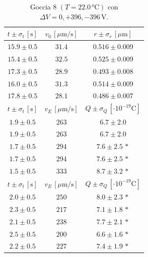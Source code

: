 \documentclass[]{article}
\begin{document}
    \begin{table}[H]
        \centering
        \begin{tabular}{||c|c|c||}
            \hline
            $t \pm \sigma_t \, \left[\text{s}\right]$ & $v_0 \, \left[\mu\text{m/s}\right]$ & $r \pm \sigma_r \, \left[\mu\text{m}\right]$ \\\hline
            \hline
            $15.9 \pm 0.5$ & $31.4$ & $0.516 \pm 0.009$ \\\hline
            $15.4 \pm 0.5$ & $32.5$ & $0.525 \pm 0.009$ \\\hline
            $17.3 \pm 0.5$ & $28.9$ & $0.493 \pm 0.008$ \\\hline
            $16.0 \pm 0.5$ & $31.3$ & $0.514 \pm 0.009$ \\\hline
            $17.8 \pm 0.5$ & $28.1$ & $0.486 \pm 0.007$ \\\hline
            \hline
            $t \pm \sigma_t \, \left[\text{s}\right]$ & $v_E \, \left[\mu\text{m/s}\right]$ & $Q \pm \sigma_Q \, \left[\cdot 10^{-19} \text{C}\right]$ \\\hline
            \hline
            $1.9 \pm 0.5$ & $263$ & $6.7 \pm 2.0$ \\\hline
            $1.9 \pm 0.5$ & $263$ & $6.7 \pm 2.0$ \\\hline
            $1.7 \pm 0.5$ & $294$ & $7.6 \pm 2.5\,\ast$ \\\hline
            $1.7 \pm 0.5$ & $294$ & $7.6 \pm 2.5\,\ast$ \\\hline
            $1.5 \pm 0.5$ & $333$ & $8.7 \pm 3.2\,\ast$ \\\hline
            \hline
            $t \pm \sigma_t \, \left[\text{s}\right]$ & $v_E \, \left[\mu\text{m/s}\right]$ & $Q \pm \sigma_Q \, \left[\cdot 10^{-19} \text{C}\right]$ \\\hline
            \hline
            $2.0 \pm 0.5$ & $250$ & $8.0 \pm 2.3\,\ast$ \\\hline
            $2.3 \pm 0.5$ & $217$ & $7.1 \pm 1.8\,\ast$ \\\hline
            $2.1 \pm 0.5$ & $238$ & $7.7 \pm 2.1\,\ast$ \\\hline
            $2.5 \pm 0.5$ & $200$ & $6.6 \pm 1.6\,\ast$ \\\hline
            $2.2 \pm 0.5$ & $227$ & $7.4 \pm 1.9\,\ast$ \\\hline
        \end{tabular}
        \caption{Goccia 8 $\left(T = 22.0\, \text{°C}\right)$ con $\Delta V = 0,+396,-396 \,\text{V}$.}
        \label{goccia-8}
    \end{table}
\end{document}

